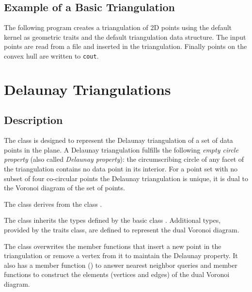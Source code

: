 \subsection{Example of a Basic Triangulation\label{Subsection_2D_Triangulations_Basic_Example}}

The following program  creates a  triangulation of 2D points
using the  default kernel 
as geometric traits and the default triangulation data structure.
 The input points are read from a file 
and inserted in the triangulation.
Finally points on the convex hull are written to {\tt cout}. 


\section{Delaunay Triangulations\label{Section_2D_Triangulations_Delaunay}}

\subsection{Description\label{Subsection_2D_Triangulations_Delaunay_Description}}
The class  is designed to represent
the Delaunay triangulation of a set of data points in the plane.
A  Delaunay triangulation
fulfills
the following {\em empty circle property} 
(also called {\em Delaunay property}): the circumscribing
circle of any facet of the triangulation 
contains no data point in its interior.
For a point set with no subset of four co-circular points
the Delaunay triangulation is unique, it is  dual
to the Voronoi diagram of the set of points.

The class  derives
from the class .

The class 
inherits the types defined by the 
basic class .
Additional types, provided by the traits class,
are defined to represent the dual Voronoi diagram.


The class 
overwrites the member functions that insert a new point
in the triangulation 
or remove a vertex  from it
to maintain the Delaunay property.
It also has a member function ()
to answer nearest neighbor queries
and member functions to construct the elements (vertices and edges)
of the dual Voronoi diagram.

